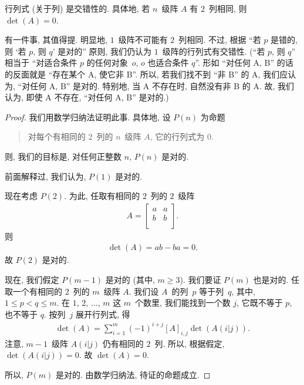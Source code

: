 \documentclass[../libro.tex]{subfiles}
\begin{document}
\begin{theorem}[交错性]
    行列式 (关于列) 是交错性的.
    具体地,
    若 \(n\)~级阵 \(A\) 有 \(2\)~列相同,
    则 \(\det {(A)} = 0\).
\end{theorem}

有一件事, 其值得提.
明显地, \(1\)~级阵不可能有 \(2\)~列相同.
不过,
根据
``若 \(p\) 是错的, 则 `若 \(p\), 则 \(q\)' 是对的''
原则,
我们仍认为 \(1\)~级阵的行列式有交错性.
(``若 \(p\), 则 \(q\)'' %
相当于
``对适合条件 \(p\) 的任何对象~\(o\),
\(o\) 也适合条件 \(q\)''.
形如 ``对任何 A, B'' 的话%
的反面就是 ``存在某个 A, 使它非 B''.
所以, 若我们找不到 ``非 B'' 的 A,
我们应认为, ``对任何 A, B'' 是对的.
特别地, 当 A 不存在时, 自然没有非 B 的 A.
故, 我们认为, 即使 A 不存在,
``对任何 A, B'' 是对的.) %

\begin{proof}
    我们用数学归纳法证明此事.
    具体地, 设 \(P(n)\) 为命题
    \begin{quotation}
        对每个有相同的 \(2\)~列的 \(n\)~级阵 \(A\),
        它的行列式为 \(0\).
    \end{quotation}
    则, 我们的目标是,
    对任何正整数 \(n\), \(P(n)\) 是对的.

    前面解释过, 我们认为, \(P(1)\) 是对的.

    现在考虑 \(P(2)\).
    为此, 任取有相同的 \(2\)~列的 \(2\)~级阵
    \begin{align*}
        A =
        \begin{bmatrix}
            a & a \\
            b & b \\
        \end{bmatrix}.
    \end{align*}
    则
    \begin{align*}
        \det {(A)}
        = ab - ba
        = 0.
    \end{align*}
    故 \(P(2)\) 是对的.

    现在, 我们假定 \(P(m-1)\) 是对的
    (其中, \(m \geq 3\)).
    我们要证 \(P(m)\) 也是对的.
    任取一个有相同的 \(2\)~列的 \(m\)~级阵 \(A\).
    我们设 \(A\)~的列~\(p\) 等于列~\(q\),
    其中, \(1 \leq p < q \leq m\).
    在 \(1\), \(2\), \(\dots\), \(m\) 这 \(m\)~个数里,
    我们能找到一个数 \(j\),
    它既不等于 \(p\), 也不等于 \(q\).
    按列~\(j\) 展开行列式, 得
    \begin{align*}
        \det {(A)}
        = \sum_{i = 1}^{m} {(-1)^{i + j} [A]_{i,j}
        \det {(A(i|j))}}.
    \end{align*}
    注意, \(m-1\)~级阵 \(A(i|j)\) 仍有相同的 \(2\)~列.
    所以, 根据假定, \(\det {(A(i|j))} = 0\).
    故 \(\det {(A)} = 0\).

    所以, \(P(m)\) 是对的.
    由数学归纳法, 待证的命题成立.
\end{proof}
\end{document}
